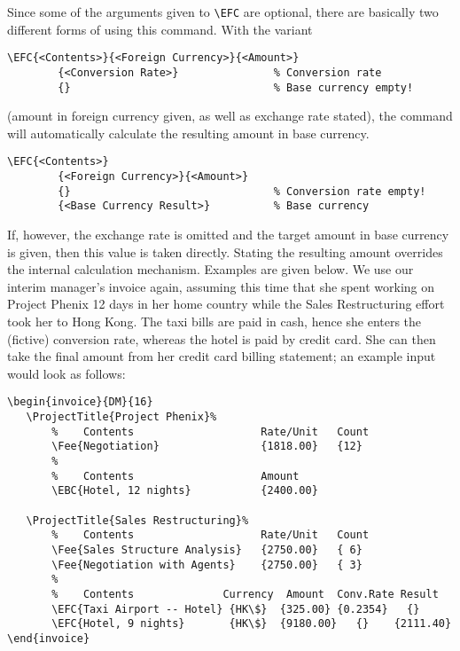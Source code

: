 \documentclass[11pt]{ltxdoc}
\begin{document}
Since some of the arguments given to \verb-\EFC- are optional,
there are basically two different forms of using this command.
With the variant

\begin{verbatim}
\EFC{<Contents>}{<Foreign Currency>}{<Amount>}
        {<Conversion Rate>}               % Conversion rate
        {}                                % Base currency empty!
\end{verbatim}

(amount in foreign currency given, as well as exchange rate stated),
the command will automatically calculate the resulting amount in
base currency.

\begin{verbatim}
\EFC{<Contents>}
        {<Foreign Currency>}{<Amount>}
        {}                                % Conversion rate empty!
        {<Base Currency Result>}          % Base currency
\end{verbatim}

If, however, the exchange rate is omitted and the target amount in
base currency is given, then this value is taken directly. Stating
the resulting amount overrides the internal calculation mechanism.
Examples are given below. We use our interim manager's invoice
again, assuming this time that she spent working on Project Phenix 
12 days in her home country while the Sales Restructuring effort
took her to Hong Kong. The taxi bills are paid in cash, hence she
enters the (fictive) conversion rate, whereas the hotel is paid by
credit card. She can then take the final amount from her credit card
billing statement; an example input would look as follows:

\begin{verbatim}
\begin{invoice}{DM}{16}
   \ProjectTitle{Project Phenix}%
       %    Contents                    Rate/Unit   Count
       \Fee{Negotiation}                {1818.00}   {12}
       %
       %    Contents                    Amount
       \EBC{Hotel, 12 nights}           {2400.00}

   \ProjectTitle{Sales Restructuring}%
       %    Contents                    Rate/Unit   Count
       \Fee{Sales Structure Analysis}   {2750.00}   { 6}
       \Fee{Negotiation with Agents}    {2750.00}   { 3}
       %
       %    Contents              Currency  Amount  Conv.Rate Result
       \EFC{Taxi Airport -- Hotel} {HK\$}  {325.00} {0.2354}   {}
       \EFC{Hotel, 9 nights}       {HK\$}  {9180.00}   {}    {2111.40}
\end{invoice}
\end{verbatim}
\end{document}

